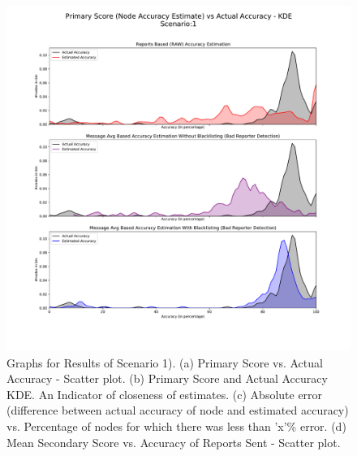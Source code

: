 \documentclass[journal]{IEEEtran}
\begin{document}
\begin{figure}[!ht]
{	}
\end{figure}
\begin{figure}[!ht]
	\caption{Graphs for Results of Scenario 1). (a) Primary Score vs. Actual Accuracy - Scatter plot. (b) Primary Score and Actual Accuracy KDE. An Indicator of closeness of estimates. (c) Absolute error (difference between actual accuracy of node and estimated accuracy) vs. Percentage of nodes for which there was less than 'x'\% error. (d) Mean Secondary Score vs. Accuracy of Reports Sent - Scatter plot.}
	\label{fig:apdx:sc1}
	\centering
	\s
	\includegraphics[width=0.5\linewidth, trim={80 95 100 100}, clip]{images/SCN1_PrimaryScoreKDEComparitive.pdf}

\end{figure}
\end{document}
